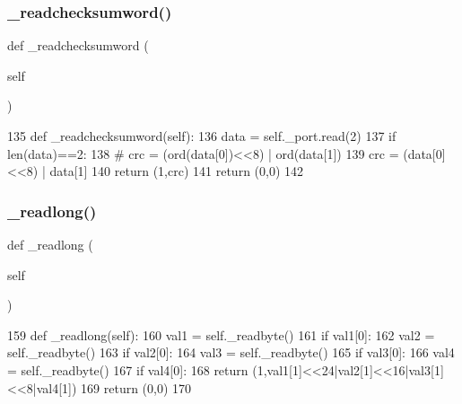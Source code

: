\subsubsection{\texorpdfstring{\+\_\+readchecksumword()}{\_readchecksumword()}}
{\footnotesize\ttfamily def \+\_\+readchecksumword (\begin{DoxyParamCaption}\item[{}]{self }\end{DoxyParamCaption})\hspace{0.3cm}{\ttfamily [private]}}


\begin{DoxyCode}
135     \textcolor{keyword}{def }\_readchecksumword(self):
136         data = self.\_port.read(2)
137         \textcolor{keywordflow}{if} len(data)==2:
138 \textcolor{comment}{#           crc = (ord(data[0])<<8) | ord(data[1])}
139             crc = (data[0]<<8) | data[1]
140             \textcolor{keywordflow}{return} (1,crc)  
141         \textcolor{keywordflow}{return} (0,0)
142         
\end{DoxyCode}
\mbox{\label{classtoxic__hardware_1_1roboclaw__3_1_1Roboclaw_a8d66ae6d6beb1bb126eb600db81d99ec}} 
\subsubsection{\texorpdfstring{\+\_\+readlong()}{\_readlong()}}
{\footnotesize\ttfamily def \+\_\+readlong (\begin{DoxyParamCaption}\item[{}]{self }\end{DoxyParamCaption})\hspace{0.3cm}{\ttfamily [private]}}


\begin{DoxyCode}
159     \textcolor{keyword}{def }\_readlong(self):
160         val1 = self.\_readbyte()
161         \textcolor{keywordflow}{if} val1[0]:
162             val2 = self.\_readbyte()
163             \textcolor{keywordflow}{if} val2[0]:
164                 val3 = self.\_readbyte()
165                 \textcolor{keywordflow}{if} val3[0]:
166                     val4 = self.\_readbyte()
167                     \textcolor{keywordflow}{if} val4[0]:
168                         \textcolor{keywordflow}{return} (1,val1[1]<<24|val2[1]<<16|val3[1]<<8|val4[1])
169         \textcolor{keywordflow}{return} (0,0)    
170 
\end{DoxyCode}
\mbox{\label{classtoxic__hardware_1_1roboclaw__3_1_1Roboclaw_a406e62b0f169ff15d7dd3304b7d18fc3}} 

